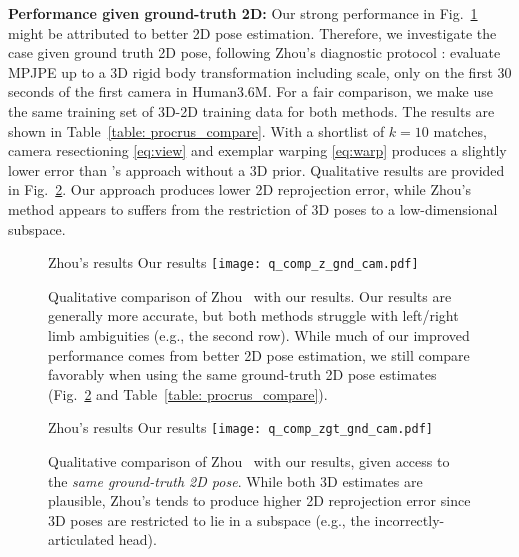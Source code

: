 \documentclass[10pt,twocolumn,letterpaper]{article}
\begin{document}
{\bf Performance given ground-truth 2D:}
Our strong performance in Fig.~\ref{fig:vis_comp} might be attributed to better 2D pose estimation. Therefore, we investigate the case given ground truth 2D pose, following Zhou's diagnostic protocol \cite{Zhou_2016_CVPR}: evaluate MPJPE up to a 3D rigid body transformation including scale, only on the first 30 seconds of the first camera in Human3.6M. For a fair comparison, we make use the same training set of 3D-2D training data for both methods. The results are shown in Table~\ref{table: procrus_compare}. With a shortlist of $k=10$ matches, camera resectioning \eqref{eq:view} and exemplar warping \eqref{eq:warp} produces a slightly lower error than \cite{Zhou_2016_CVPR}'s approach without a 3D prior.
Qualitative results are provided in Fig.~\ref{fig:vis_comp_gt2d}. Our approach produces lower 2D reprojection error, while Zhou's method appears to suffers from the restriction of 3D poses to a low-dimensional subspace.


\begin{figure}[t!]
\centering
Zhou's results \hspace{45pt} Our results
\texttt{[image: q\_comp\_z\_gnd\_cam.pdf]}
   \caption{Qualitative comparison of Zhou~\cite{Zhou_2016_CVPR} with our results. Our results are generally more accurate, but both methods struggle with left/right limb ambiguities (e.g., the second row). While much of our improved performance comes from better 2D pose estimation, we still compare favorably when using the same ground-truth 2D pose estimates (Fig.~\ref{fig:vis_comp_gt2d} and Table~\ref{table: procrus_compare}).}
\label{fig:vis_comp}
\end{figure}

\begin{figure}[t!]
\centering
Zhou's results \hspace{45pt} Our results
\texttt{[image: q\_comp\_zgt\_gnd\_cam.pdf]}
   \caption{Qualitative comparison of Zhou~\cite{Zhou_2016_CVPR} with our results, given access to the {\em same ground-truth 2D pose}. While both 3D estimates are plausible, Zhou's tends to produce higher 2D reprojection error since 3D poses are restricted to lie in a subspace (e.g., the incorrectly-articulated head).}
\label{fig:vis_comp_gt2d}
\end{figure}
\end{document}
